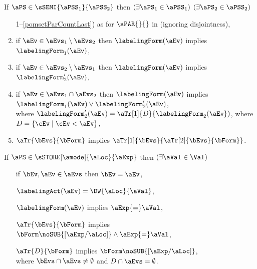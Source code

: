 \begin{definition}
  \noindent
  If $\aPS \in \sSEMI{\aPSS_1}{\aPSS_2}$ then
  $(\exists\aPS_1\in\aPSS_1)$ $(\exists\aPS_2\in\aPSS_2)$
  \begin{enumerate}[topsep=0pt]
    \setcounter{enumi}{\value{pomsetParCount}}
  \item[1--\ref{pomsetParCountLast})]
    as for $\sPAR{}{}$  in  (ignoring disjointness),
  \item \label{seq-kappa1}
    if $\aEv\in\aEvs_1\setminus\aEvs_2$ then $\labelingForm(\aEv)$ implies $\labelingForm_1(\aEv)$,
  \item \label{seq-kappa2}
    if $\aEv\in\aEvs_2\setminus\aEvs_1$ then $\labelingForm(\aEv)$ implies $\labelingForm'_2(\aEv)$,
  \item \label{seq-kappa12}
    if $\aEv\in\aEvs_1\cap\aEvs_2$ then $\labelingForm(\aEv)$ implies $\labelingForm_1(\aEv)\lor\labelingForm'_2(\aEv)$,
    \\ where $\labelingForm'_2(\aEv)=\aTr[1]{\cEvs%
    }{\labelingForm_2(\aEv})$, where $\cEvs=\{ \cEv \mid \cEv < \aEv \}$,
  \item \label{seq-tau}
    $\aTr{\bEvs}{\bForm}$ implies $\aTr[1]{\bEvs}{\aTr[2]{\bEvs}{\bForm}}$.
    \setcounter{pomsetXSemiCount}{\value{enumi}}
  \end{enumerate}

  \noindent
  If $\aPS \in \sSTORE[\amode]{\aLoc}{\aExp}$ then
  $(\exists\aVal\in\Val)$
  \begin{enumerate}[topsep=0pt]
  \item[{\labeltext[S1]{S1)}{S1}}]
    if $\bEv,\aEv\in\aEvs$ then $\bEv=\aEv$,
  \item[{\labeltext[S2]{S2)}{S2}}]
    $\labelingAct(\aEv) = \DW{\aLoc}{\aVal}$,
  \item[{\labeltext[S3]{S3)}{S3}}]
    $\labelingForm(\aEv)$ implies $\aExp{=}\aVal$,
  \item[{\labeltext[S4]{S4)}{S4}}]
    $\aTr{\bEvs}{\bForm}$ implies $\bForm\noSUB{[\aExp/\aLoc]}\land\aExp{=}\aVal$, %
  \item[{\labeltext[S5]{S5)}{S5}}]
    $\aTr{\cEvs}{\bForm}$ implies $\bForm\noSUB{[\aExp/\aLoc]}$, %
    \\ where $\bEvs\cap\aEvs\neq\emptyset$ and $\cEvs\cap\aEvs=\emptyset$.
  \end{enumerate}


\end{definition}
